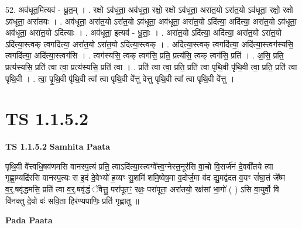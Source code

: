 \documentclass[17pt]{extarticle}
\begin{document}
52. अव॑धूत॒मित्यव॑ - धू॒त॒म् । . रक्षो ऽव॑धूता॒ अव॑धूता॒ रक्षो॒ रक्षो ऽव॑धूता॒ अरा॑त॒यो ऽरा॑त॒यो ऽव॑धूता॒ रक्षो॒ रक्षो ऽव॑धूता॒ अरा॑तयः । . अव॑धूता॒ अरा॑त॒यो ऽरा॑त॒यो ऽव॑धूता॒ अव॑धूता॒ अरा॑त॒यो ऽदि॑त्या॒ अदि॑त्या॒ अरा॑त॒यो ऽव॑धूता॒ अव॑धूता॒ अरा॑त॒यो ऽदि॑त्याः । . अव॑धूता॒ इत्यव॑ - धू॒ताः॒ । . अरा॑त॒यो ऽदि॑त्या॒ अदि॑त्या॒ अरा॑त॒यो ऽरा॑त॒यो ऽदि॑त्या॒स्त्वक् त्वगदि॑त्या॒ अरा॑त॒यो ऽरा॑त॒यो ऽदि॑त्या॒स्त्वक् । . अदि॑त्या॒स्त्वक् त्वगदि॑त्या॒ अदि॑त्या॒स्त्वग॑स्यसि॒ त्वगदि॑त्या॒ अदि॑त्या॒स्त्वग॑सि । . त्वग॑स्यसि॒ त्वक् त्वग॑सि॒ प्रति॒ प्रत्य॑सि॒ त्वक् त्वग॑सि॒ प्रति॑ । . अ॒सि॒ प्रति॒ प्रत्य॑स्यसि॒ प्रति॑ त्वा त्वा॒ प्रत्य॑स्यसि॒ प्रति॑ त्वा । . प्रति॑ त्वा त्वा॒ प्रति॒ प्रति॑ त्वा पृथि॒वी पृ॑थि॒वी त्वा॒ प्रति॒ प्रति॑ त्वा पृथि॒वी । . त्वा॒ पृ॒थि॒वी पृ॑थि॒वी त्वा᳚ त्वा पृथि॒वी वे᳚त्तु वेत्तु पृथि॒वी त्वा᳚ त्वा पृथि॒वी वे᳚त्तु । \newline
\pagebreak
{}
\section*{ TS 1.1.5.2 }

\textbf{TS 1.1.5.2 } \newline
\textbf{Samhita Paata} \newline

पृथि॒वी वे᳚त्त्वधि॒षव॑णमसि वानस्प॒त्यं प्रति॒ त्वाऽदि॑त्या॒स्त्वग्वे᳚त्त्व॒ग्नेस्त॒नूर॑सि वा॒चो वि॒सर्ज॑नं दे॒ववी॑तये त्वा गृह्णा॒म्यद्रि॑रसि वानस्प॒त्यः स इ॒दं दे॒वेभ्यो॑ ह॒व्यꣳ सु॒शमि॑ शमि॒ष्वेष॒मा व॒दोर्ज॒मा व॑द द्यु॒मद्व॑दत व॒यꣳ सं॑घा॒तं जे᳚ष्म व॒र्॒.षवृ॑द्धमसि॒ प्रति॑ त्वा व॒र्॒.षवृ॑द्धं ॅवेत्तु॒ परा॑पूतꣳ॒॒ रक्षः॒ परा॑पूता॒ अरा॑तयो॒ रक्ष॑सां भा॒गो॑ ( ) ऽसि वा॒युर्वो॒ वि वि॑नक्तु दे॒वो वः॑ सवि॒ता हिर॑ण्यपाणिः॒ प्रति॑ गृह्णातु ॥ \newline

\textbf{Pada Paata} \newline
\end{document}

